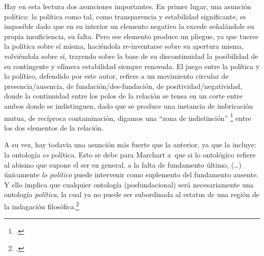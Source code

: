 Hay en esta lectura dos asunciones importantes. En primer lugar, una asunción política: la política como tal, como transparencia y estabilidad significante, es imposible dado que en su interior un elemento negativo la excede señalándole su propia insuficiencia, su falta. Pero ese elemento produce un pliegue, ya que tuerce la política sobre sí misma, haciéndola re-inventarse sobre su apertura misma, volviéndola sobre sí, trayendo sobre la base de su discontinuidad la posibilidad de su contingente y efímera estabilidad siempre renovada. El juego entre la política y lo político, defendido por este autor, refiere a un movimiento circular de presencia/ausencia, de fundación/des-fundación, de positividad/negatividad, donde la continuidad entre los polos de la relación se tensa en un corte entre ambos donde se indistinguen, dado que se produce una instancia de imbricación mutua, de recíproca contaminación, digamos una \enquote{zona de indistinción} \footcite[19]{@7101-AGAMBEN2003} entre los dos elementos de la relación.

A su vez, hay todavía una asunción más fuerte que la anterior, ya que la incluye: la ontología \emph{es} política. Esto se debe para Marchart a~que si lo ontológico refiere al abismo que supone el ser en general, a la falta de fundamento último, (\ldots) únicamente \emph{lo político} puede intervenir como suplemento del fundamento ausente. Y ello implica que cualquier ontología (posfundacional)  será necesariamente una ontología \emph{política}, la cual ya no puede ser subordinada al estatus de una región de la indagación filosófica.\footcite[216]{@7093-MARCHART2009}


